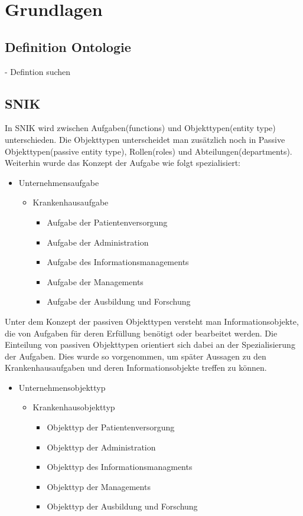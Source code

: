 \chapter{Grundlagen}
\label{ch:basics}
\section{Definition Ontologie}
- Defintion suchen
\section{SNIK}
In \ac{SNIK} wird zwischen Aufgaben(functions) und Objekttypen(entity type) unterschieden. 
Die Objekttypen unterscheidet man zusätzlich noch in Passive Objekttypen(passive entity type), Rollen(roles) und Abteilungen(departments).
Weiterhin wurde das Konzept der Aufgabe wie folgt spezialisiert:\cite{Schaaf.}
\begin{itemize}
	\item Unternehmensaufgabe
	\begin{itemize}
		\item Krankenhausaufgabe
		\begin{itemize}
			\item Aufgabe der Patientenversorgung
			\item Aufgabe der Administration
			\item Aufgabe des Informationsmanagements
			\item Aufgabe der Managements
			\item Aufgabe der Ausbildung und Forschung
		\end{itemize}
	\end{itemize}
\end{itemize}

Unter dem Konzept der passiven Objekttypen versteht man \glqq{}Informationsobjekte, die von Aufgaben für deren Erfüllung benötigt oder bearbeitet werden\grqq{}. 
Die Einteilung von passiven Objekttypen orientiert sich dabei an der Spezialisierung der Aufgaben.
Dies wurde so vorgenommen, um später Aussagen zu den Krankenhausaufgaben und deren Informationsobjekte treffen zu können.\cite{Schaaf.}
\begin{itemize}
	\item Unternehmensobjekttyp
	\begin{itemize}
		\item Krankenhausobjekttyp
		\begin{itemize}
			\item Objekttyp der Patientenversorgung
			\item Objekttyp der Administration
			\item Objekttyp des Informationsmanagments
			\item Objekttyp der Managements
			\item Objekttyp der Ausbildung und Forschung
		\end{itemize}
	\end{itemize}
\end{itemize}\cite{Schaaf.}

